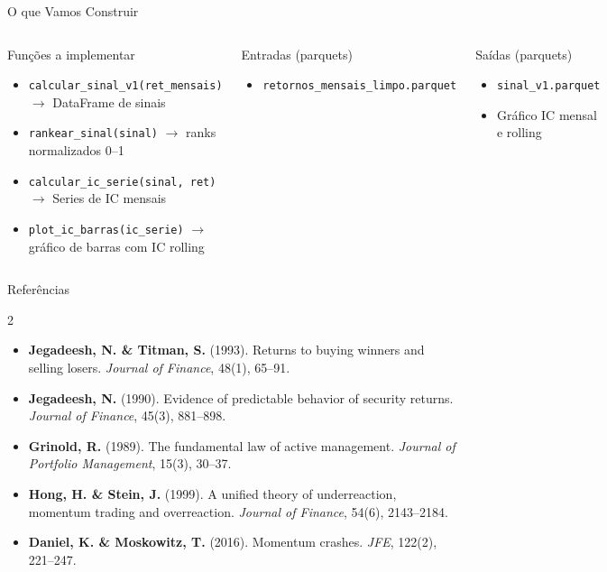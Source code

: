 \documentclass[aspectratio=169,12pt]{beamer}
\begin{document}
\begin{frame}[fragile]{O que Vamos Construir}
\begin{columns}[T]
\begin{block}{Funções a implementar}
\begin{itemize}
  \item \texttt{calcular\_sinal\_v1(ret\_mensais)} $\to$ DataFrame de sinais
  \item \texttt{rankear\_sinal(sinal)} $\to$ ranks normalizados 0--1
  \item \texttt{calcular\_ic\_serie(sinal, ret)} $\to$ Series de IC mensais
  \item \texttt{plot\_ic\_barras(ic\_serie)} $\to$ gráfico de barras com IC rolling
\end{itemize}
\end{block}
\begin{block}{Entradas (parquets)}
\begin{itemize}
  \item \texttt{retornos\_mensais\_limpo.parquet}
\end{itemize}
\end{block}
\vspace{.4em}
\begin{exampleblock}{Saídas (parquets)}
\begin{itemize}
  \item \texttt{sinal\_v1.parquet}
  \item Gráfico IC mensal e rolling
\end{itemize}
\end{exampleblock}
\end{columns}
\end{frame}

\begin{frame}[fragile]{Referências}
\begin{multicols}{2}
\tiny
\begin{itemize}
  \item \textbf{Jegadeesh, N. \& Titman, S.} (1993). Returns to buying winners and selling losers. \textit{Journal of Finance}, 48(1), 65--91.
  \item \textbf{Jegadeesh, N.} (1990). Evidence of predictable behavior of security returns. \textit{Journal of Finance}, 45(3), 881--898.
  \item \textbf{Grinold, R.} (1989). The fundamental law of active management. \textit{Journal of Portfolio Management}, 15(3), 30--37.
  \item \textbf{Hong, H. \& Stein, J.} (1999). A unified theory of underreaction, momentum trading and overreaction. \textit{Journal of Finance}, 54(6), 2143--2184.
  \item \textbf{Daniel, K. \& Moskowitz, T.} (2016). Momentum crashes. \textit{JFE}, 122(2), 221--247.
\end{itemize}
\end{multicols}
\end{frame}
\end{document}
